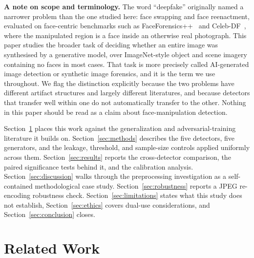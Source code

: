 \documentclass[3p,times,procedia]{elsarticle}
\begin{document}
\textbf{A note on scope and terminology.} The word ``deepfake'' originally
named a narrower problem than the one studied here: face swapping and face
reenactment, evaluated on face-centric benchmarks such as
FaceForensics++~\cite{rossler2019ff} and Celeb-DF~\cite{li2020celebdf}, where
the manipulated region is a face inside an otherwise real photograph. This
paper studies the broader task of deciding whether an entire image was
synthesised by a generative model, over ImageNet-style object and scene
imagery containing no faces in most cases. That task is more precisely
called AI-generated image detection or synthetic image forensics, and it is
the term we use throughout. We flag the distinction explicitly because the
two problems have different artifact structures and largely different
literatures, and because detectors that transfer well within one do not
automatically transfer to the other. Nothing in this paper should be read as
a claim about face-manipulation detection.

Section~\ref{sec:related} places this work against the generalization and
adversarial-training literature it builds on. Section~\ref{sec:methods}
describes the five detectors, five generators, and the leakage, threshold,
and sample-size controls applied uniformly across them.
Section~\ref{sec:results} reports the cross-detector comparison, the paired
significance tests behind it, and the calibration analysis.
Section~\ref{sec:discussion} walks through the preprocessing investigation
as a self-contained methodological case study.
Section~\ref{sec:robustness} reports a JPEG re-encoding robustness check.
Section~\ref{sec:limitations} states what this study does not establish,
Section~\ref{sec:ethics} covers dual-use considerations, and
Section~\ref{sec:conclusion} closes.

\section{Related Work}
\label{sec:related}
\end{document}
